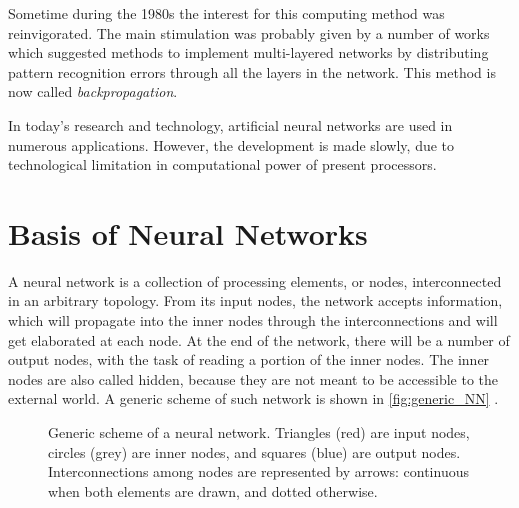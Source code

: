 Sometime during the 1980s the interest for this computing method was reinvigorated.
The main stimulation was probably given by a number of works which suggested methods to implement multi-layered networks by distributing pattern recognition errors through all the layers in the network.
This method is now called \textit{backpropagation}.

In today's research and technology, artificial neural networks are used in numerous applications.
However, the development is made slowly, due to technological limitation in computational power of present processors.

\section{Basis of Neural Networks}
\label{sec:Basis_of_Neural_Networks}

A neural network is a collection of processing elements, or nodes, interconnected in an arbitrary topology.
From its input nodes, the network accepts information, which will propagate into the inner nodes through the interconnections and will get elaborated at each node.
At the end of the network, there will be a number of output nodes, with the task of reading a portion of the inner nodes.
The inner nodes are also called hidden, because they are not meant to be accessible to the external world.
A generic scheme of such network is shown in \autoref{fig:generic_NN} .

\begin{figure}[ht]
	\centering
	
	\caption{	Generic scheme of a neural network. %
						Triangles (red) are input nodes, circles (grey) are inner nodes, and squares (blue) are output nodes. %
						Interconnections among nodes are represented by arrows: %
						continuous when both elements are drawn, and dotted otherwise.
						}
	\label{fig:generic_NN}
\end{figure}

